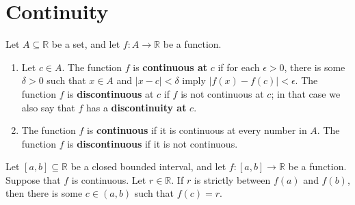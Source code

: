 \chapter{Continuity}
\begin{definition}
	\cite{the-real-numbers-and-real-analysis}
	\label{bloch-definition-3.3.1}
	Let $A \subseteq \mathbb{R}$ be a set, and let $f : A \to \mathbb{R}$ be a function.
	\begin{enumerate}
		\item Let $c \in A$. The function $f$ is \textbf{continuous at} $c$ if for each $\epsilon > 0$, there is some $\delta > 0$ such that $x \in A$ and $|x-c| < \delta$ imply $\left| f(x) - f(c) \right| < \epsilon$. The function $f$ is \textbf{discontinuous} at $c$ if $f$ is not continuous at $c$; in that case we also say that $f$ has a \textbf{discontinuity at} $c$.
		\item The function $f$ is \textbf{continuous} if it is continuous at every number in $A$. The function $f$ is \textbf{discontinuous} if it is not continuous.
	\end{enumerate}
\end{definition}

\begin{theorem}
	\cite{the-real-numbers-and-real-analysis}
	\label{bloch-theorem-3.5.2}
	Let $\left[ a, b \right] \subseteq \mathbb{R}$ be a closed bounded interval, and let $f : \left[ a, b \right] \to \mathbb{R}$ be a function. Suppose that $f$ is continuous. Let $r \in \mathbb{R}$. If $r$ is strictly between $f(a)$ and $f(b)$, then there is some $c \in \left( a, b \right)$ such that $f(c) = r$.
\end{theorem}
